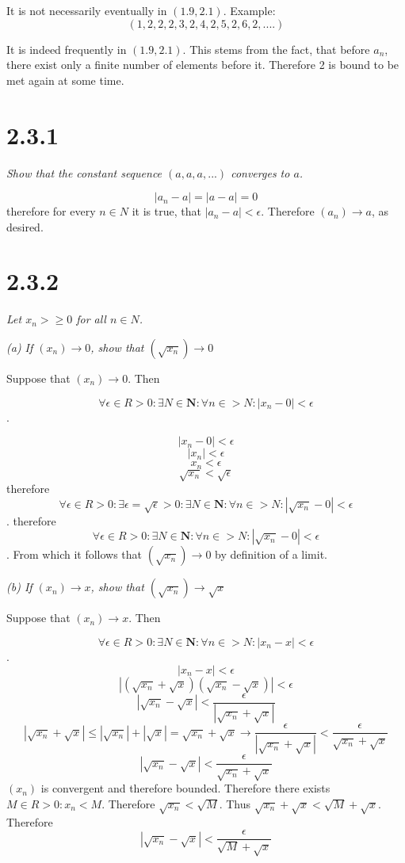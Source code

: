 \documentclass[11pt,oneside,titlepage]{article}
\begin{document}
It is not necessarily eventually  in $(1.9, 2.1)$. Example:
$$(1, 2, 2, 2, 3, 2, 4, 2, 5, 2, 6, 2, ....)$$

It is indeed frequently in $(1.9, 2.1)$. This stems from the fact, that before $a_n$,
there exist only a finite number of elements before it. Therefore 2 is bound to
be met again at some time.

\section*{2.3.1}
\textit{Show that the constant sequence $(a, a, a, ...)$ converges to $a$.}

$$|a_n - a| = |a - a| = 0$$
therefore for every $n \in N$ it is true, that $|a_n - a| < \epsilon$.
Therefore $(a_n) \to a$, as desired.

\section*{2.3.2}
\textit{Let $x_n >\geq 0$ for all $n \in N$.}

\textit{(a) If $(x_n) \to 0$, show that $(\sqrt{x_n}) \to 0$}

Suppose that $(x_n) \to 0$. Then

$$\forall \epsilon \in R > 0: \exists N \in \textbf{N}: \forall n \in  > N:
|x_n - 0| < \epsilon$$.

$$|x_n - 0| < \epsilon$$
$$|x_n| < \epsilon$$
$$x_n < \epsilon$$
$$\sqrt{x_n} < \sqrt{\epsilon}$$
therefore
$$\forall \epsilon \in R > 0: \exists \epsilon = \sqrt{\epsilon} > 0:
\exists N \in \textbf{N}: \forall n \in  > N: |\sqrt{x_n} - 0| < \epsilon$$.
therefore
$$\forall \epsilon \in R > 0: 
\exists N \in \textbf{N}: \forall n \in  > N: |\sqrt{x_n} - 0| < \epsilon$$.
From which it follows that $(\sqrt{x_n}) \to 0$ by definition of a limit.

\textit{(b) If $(x_n) \to x$, show that $(\sqrt{x_n}) \to \sqrt{x}$}

Suppose that $(x_n) \to x$. Then

$$\forall \epsilon \in R > 0: \exists N \in \textbf{N}: \forall n \in  > N:
|x_n - x| < \epsilon$$.
$$|x_n - x|  < \epsilon$$
$$|(\sqrt{x_n} + \sqrt{x})(\sqrt{x_n} - \sqrt{x})|  < \epsilon$$
$$|\sqrt{x_n} - \sqrt{x}|  < \frac{\epsilon}{|\sqrt{x_n} + \sqrt{x}|}$$
$$ |\sqrt{x_n} + \sqrt{x}| \leq |\sqrt{x_n}| + |\sqrt{x}| = \sqrt{x_n} +
\sqrt{x} \to \frac{\epsilon}{|\sqrt{x_n} + \sqrt{x}|} <
\frac{\epsilon}{\sqrt{x_n} + \sqrt{x}}$$
$$|\sqrt{x_n} - \sqrt{x}|  < \frac{\epsilon}{\sqrt{x_n} + \sqrt{x}}$$
$(x_n)$ is convergent and therefore bounded. Therefore there exists
$M \in R > 0: x_n < M$. Therefore $\sqrt{x_n} < \sqrt{M}$. Thus
$\sqrt{x_n} + \sqrt{x} < \sqrt{M} + \sqrt{x}$. Therefore
$$|\sqrt{x_n} - \sqrt{x}|  < \frac{\epsilon}{\sqrt{M} + \sqrt{x}}$$
\end{document}
